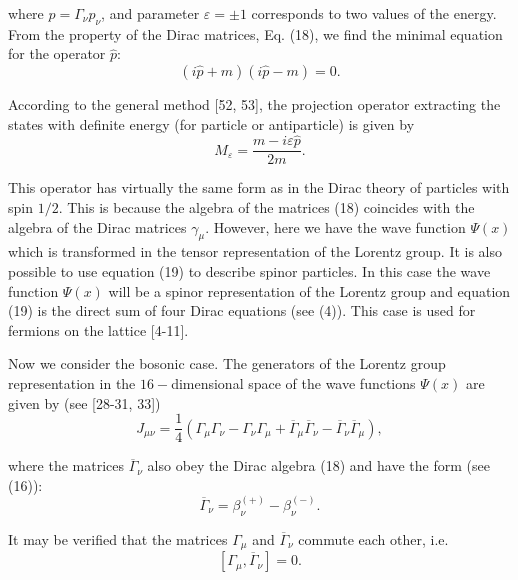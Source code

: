 \documentclass[a4paper,12pt]{article}
\begin{document}
where $\widehat{p}=\Gamma _\nu p_\nu $, and parameter $\varepsilon
=\pm 1$ corresponds to two values of the energy. From the property
of the Dirac matrices, Eq. (18), we find the minimal equation for
the operator $\widehat{p }$:
\begin{equation}
\left( i\widehat{p}+m\right) \left( i\widehat{p}-m\right) =0 .
\label{21}
\end{equation}

According to the general method [52, 53], the projection operator
extracting the states with definite energy (for particle or
antiparticle) is given by
\begin{equation}
M_\varepsilon =\frac{m-i\varepsilon \widehat{p}}{2m} . \label{22}
\end{equation}

This operator has virtually the same form as in the Dirac theory of
particles with spin $1/2$. This is because the algebra of the matrices (18)
coincides with the algebra of the Dirac matrices $\gamma _\mu .$ However,
here we have the wave function $\Psi (x)$ which is transformed in the tensor
representation of the Lorentz group. It is also possible to use equation
(19) to describe spinor particles. In this case the wave function $\Psi (x)$
will be a spinor representation of the Lorentz group and equation (19) is
the direct sum of four Dirac equations (see (4)). This case is used for
fermions on the lattice [4-11].

Now we consider the bosonic case. The generators of the Lorentz group
representation in the $16-$dimensional space of the wave functions $\Psi (x)$
are given by (see [28-31, 33])
\begin{equation}
J_{\mu \nu }=\frac 14\left( \Gamma _\mu \Gamma _\nu -\Gamma _\nu
\Gamma _\mu +\overline{\Gamma }_\mu \overline{\Gamma }_\nu
-\overline{\Gamma }_\nu \overline{\Gamma }_\mu \right) ,
\label{23}
\end{equation}

where the matrices $\overline{\Gamma }_\nu $ also obey the Dirac algebra
(18) and have the form (see (16)):
\begin{equation}
\overline{\Gamma }_\nu =\beta _\nu ^{(+)}-\beta _\nu ^{(-)} .
\label{24}
\end{equation}

It may be verified that the matrices $\Gamma _\mu $ and
$\overline{\Gamma } _\nu $ commute each other, i.e.
\begin{equation}
\left[ \Gamma _\mu ,\overline{\Gamma }_\nu \right] =0 . \label{25}
\end{equation}
\end{document}
